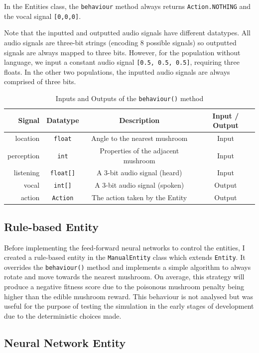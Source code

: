 \documentclass[12pt,a4paper,twoside,openright]{report}
\begin{document}
In the Entities class, the \texttt{behaviour} method always returns \texttt{Action.NOTHING} and the vocal signal \texttt{[0,0,0]}.

Note that the inputted and outputted audio signals have different datatypes. All audio signals are three-bit strings (encoding 8 possible signals) so outputted signals are always mapped to three bits. However, for the population without language, we input a constant audio signal \texttt{[0.5, 0.5, 0.5]}, requiring three floats. In the other two populations, the inputted audio signals are always comprised of three bits.

\begin{table}[t]
\centering
 \begin{tabular}{ r | c | c | c}
 \bf{Signal} & \bf{Datatype} & \bf{Description} & \bf{Input / Output} \\ [0.5ex] 
 \hline
location & \texttt{float} & Angle to the nearest mushroom & Input \\
perception & \texttt{int} & Properties of the adjacent mushroom & Input \\
listening & \texttt{float[]} & A 3-bit audio signal (heard) & Input \\
vocal & \texttt{int[]} & A 3-bit audio signal (spoken) & Output \\
action & \texttt{Action} & The action taken by the Entity & Output \\
\end{tabular}
\caption{Inputs and Outputs of the \texttt{behaviour()} method}
\label{table:behaviour}
\end{table}

\subsection{Rule-based Entity}

Before implementing the feed-forward neural networks to control the entities, I created a rule-based entity in the \texttt{ManualEntity} class which extends \texttt{Entity}. It overrides the \texttt{behaviour()} method and implements a simple algorithm to always rotate and move towards the nearest mushroom. On average, this strategy will produce a negative fitness score due to the poisonous mushroom penalty being higher than the edible mushroom reward. This behaviour is not analysed but was useful for the purpose of testing the simulation in the early stages of development due to the deterministic choices made.

\subsection{Neural Network Entity}
\end{document}
